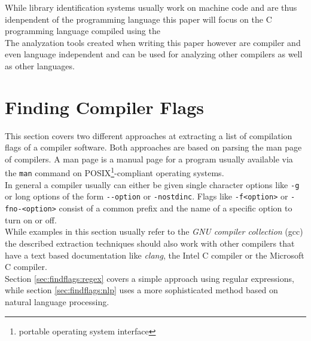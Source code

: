\documentclass[9pt, a4paper, twocolumn]{article}
\begin{document}
While library identification systems usually work on machine code and are thus idenpendent of the programming language this paper will focus on the C programming language compiled using the  \\
The analyzation tools created when writing this paper however are compiler and even language independent and can be used for analyzing other compilers as well as other languages.
\fi


\section{Finding Compiler Flags} \label{sec:findflags}
This section covers two different approaches at extracting a list of compilation flags of a compiler software. Both approaches are based on parsing the man page of compilers. A man page is a manual page for a program usually available via the \verb'man' command on POSIX\footnote{portable operating system interface}-compliant operating systems. \\
In general a compiler usually can either be given single character options like \verb'-g' or long options of the form \verb'--option' or \verb'-nostdinc'. Flags like \verb'-f<option>' or \verb'-fno-<option>' consist of a common prefix and the name of a specific option to turn on or off. \\
While examples in this section usually refer to the \textit{GNU compiler collection} (gcc) the described extraction techniques should also work with other compilers that have a text based documentation like \textit{clang}, the Intel C compiler or the Microsoft C compiler. \\
Section \ref{sec:findflags:regex} covers a simple approach using regular expressions, while section \ref{sec:findflags:nlp} uses a more sophisticated method based on natural language processing.
\end{document}
